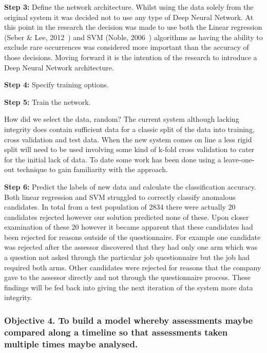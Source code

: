 \textbf{Step 3:} Define the network architecture. Whilst using the data solely from the original system it was decided not to use any type of Deep Neural Network. At this point in the research the decision was made to use both the Linear regression (Seber \& Lee, 2012~\cite{seber2012linear}) and SVM (Noble, 2006~\cite{noble2006support}) algorithms as having the ability to exclude rare occurrences was considered more important than the accuracy of those decisions. Moving forward it is the intention of the research to introduce a Deep Neural Network architecture.


\textbf{Step 4:} Specify training options.

\textbf{Step 5:} Train the network.

How did we select the data, random?
The current system although lacking integrity does contain sufficient data for a classic split of the data into training, cross validation and test data. When the new system comes on line a less rigid split will need to be used involving some kind of k-fold cross validation to cater for the initial lack of data. To date some work has been done using a leave-one-out technique to gain familiarity with the approach.

\textbf{Step 6:} Predict the labels of new data and calculate the classification accuracy. Both linear regression and SVM struggled to correctly classify anomalous candidates. In total from a test population of 2834 there were actually 20 candidates rejected however our solution predicted none of these. Upon closer examination of these 20 however it became apparent that these candidates had been rejected for reasons outside of the questionnaire. For example one candidate was rejected after the assessor discovered that they had only one arm which was a question not asked through the particular job questionnaire but the job had required both arms. Other candidates were rejected for reasons that the company gave to the assessor directly and not through the questionnaire process. These findings will be fed back into giving the next iteration of the system more data integrity.


\subsubsection{Objective 4. To build a model whereby assessments maybe compared along a timeline so that assessments taken multiple times maybe analysed.}

